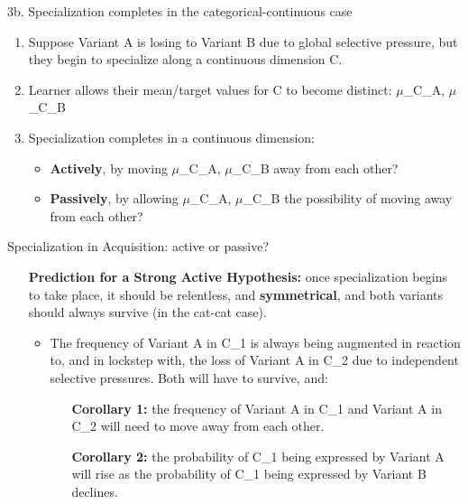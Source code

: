 \documentclass[hyperref={pdfpagelabels=false}]{beamer}
\begin{document}
\begin{frame}{3b. Specialization completes in the categorical-continuous case}
		\begin{enumerate}
			\item Suppose Variant A is losing to Variant B due to global selective pressure, but they begin to specialize along a continuous dimension C.
			\item Learner allows their mean/target values for C to become distinct: $\mu$_{C_A},  $\mu$_{C_B}
			\item Specialization completes in a continuous dimension:
			\begin{itemize}
				\item \textbf{Actively}, by moving $\mu$_{C_A},  $\mu$_{C_B} away from each other?
				\item \textbf{Passively}, by allowing $\mu$_{C_A},  $\mu$_{C_B} the possibility of moving away from each other?
			\end{itemize}
		\end{enumerate}
\end{frame}

\begin{frame}{Specialization in Acquisition: active or passive?}
		\begin{itemize}
			\item[] \textbf{Prediction for a Strong Active Hypothesis:} once specialization begins to take place, it should be relentless, and \textbf{symmetrical}, and both variants should always survive (in the cat-cat case).
				\begin{itemize}
					\item The frequency of Variant A in C_1 is always being augmented in reaction to, and in lockstep with, the loss of Variant A in C_2 due to independent selective pressures. Both will have to survive, and:
					\begin{itemize}
					\item[\textbf{Corollary 1:}] the frequency of Variant A in C_1 and Variant A in C_2 will need to move away from each other.
					\item[\textbf{Corollary 2:}] the probability of C_1 being expressed by Variant A will rise as the probability of C_1 being expressed by Variant B declines.
					\end{itemize}
				\end{itemize}
		\end{itemize}
\end{frame}
\end{document}
